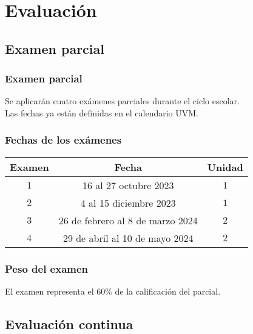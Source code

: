 \documentclass[14pt]{beamer}
\begin{document}
\section{Evaluación}
\subsection{Examen parcial}

\begin{frame}
\frametitle{Examen parcial}
Se aplicarán cuatro exámenes parciales durante el ciclo escolar.
\\
\bigskip
Las fechas ya están definidas en el calendario UVM.
\end{frame}
\begin{frame}
\frametitle{Fechas de los exámenes}
\begin{table}
\renewcommand{\arraystretch}{1.1}
\centering
\begin{tabular}{c | c | c}
Examen & Fecha & Unidad \\ \hline
$1$ & 16 al 27 octubre 2023 & $1$ \\ \hline
$2$ & 4 al 15 diciembre 2023 & $1$ \\ \hline
$3$ & 26 de febrero al 8 de marzo 2024 & $2$ \\ \hline
$4$ & 29 de abril al 10 de mayo 2024 & $2$ \\ \hline
\end{tabular}
\end{table}
\end{frame}
\begin{frame}
\frametitle{Peso del examen}
El examen representa el $60\%$ de la calificación del parcial.
\end{frame}

\subsection{Evaluación continua}
\end{document}
